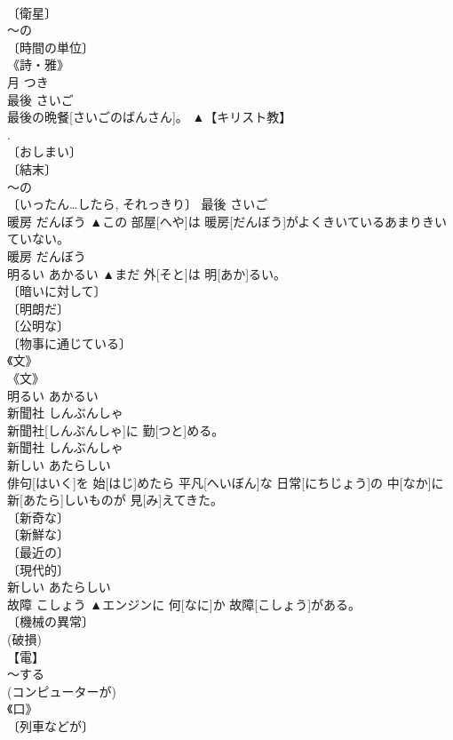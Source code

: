 \documentclass[8pt]{extreport}
\begin{document}
\begin{CJK}{UTF8}{min}
\\	〔衛星〕 
\\	～の 
\\	〔時間の単位〕 
\\	《詩・雅》 
\\	月	つき	
\\	最後	さいご	
\\	最後の晩餐[さいごのばんさん]。	▲【キリスト教】 
\\	[⇒「最後の晩餐」].	
\\	〔おしまい〕 
\\	〔結末〕 
\\	～の 
\\	〔いったん…したら, それっきり〕	最後	さいご	
\\	暖房	だんぼう	▲この 部屋[へや]は 暖房[だんぼう]がよくきいている{あまりきいていない}。	
\\	暖房	だんぼう	
\\	明るい	あかるい	▲まだ 外[そと]は 明[あか]るい。	
\\	〔暗いに対して〕 
\\	〔明朗だ〕 
\\	〔公明な〕 
\\	〔物事に通じている〕 
\\	《文》 
\\	《文》 
\\	明るい	あかるい	
\\	新聞社	しんぶんしゃ	
\\	新聞社[しんぶんしゃ]に 勤[つと]める。	
\\	新聞社	しんぶんしゃ	
\\	新しい	あたらしい	
\\	俳句[はいく]を 始[はじ]めたら 平凡[へいぼん]な 日常[にちじょう]の 中[なか]に 新[あたら]しいものが 見[み]えてきた。	
\\	〔新奇な〕 
\\	〔新鮮な〕 
\\	〔最近の〕 
\\	〔現代的〕 
\\	新しい	あたらしい	
\\	故障	こしょう	▲エンジンに 何[なに]か 故障[こしょう]がある。	
\\	〔機械の異常〕 
\\	(破損) 
\\	【電】 
\\	～する 
\\	(コンピューターが) 
\\	《口》 
\\	〔列車などが〕 

\end{CJK}
\end{document}
